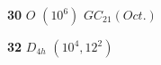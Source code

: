 \documentclass{beamer}
\begin{document}
\begin{frame}
\begin{center}
\begin{minipage}{2.3cm}
{\bf 30} $O$
$(10^6)$ {\bf $GC_{21}(Oct.)$}  
\end{minipage}
\begin{minipage}{2.1cm}
\centering
{}\par
{\bf 32} $D_{4h}$
$(10^4,12^2)$
\end{minipage}
\end{center}
\end{frame} 
\end{document}
